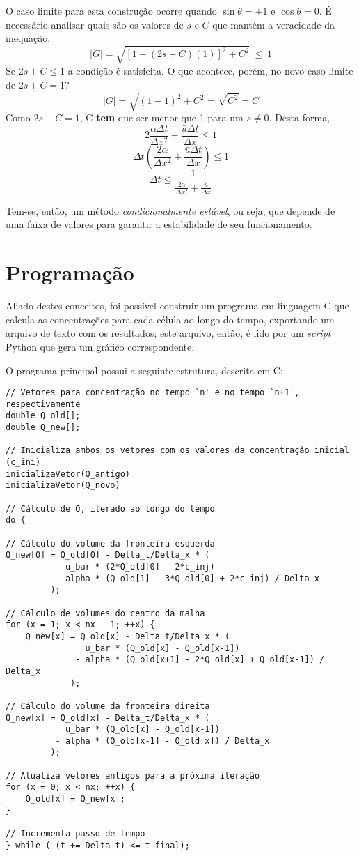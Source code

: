 O caso limite para esta construção ocorre quando $\sin\theta = \pm 1$ e
$\cos\theta = 0$. É necessário analisar quais são os valores de $s$ e $C$ que
mantém a veracidade da inequação.
\[
    |G| = \sqrt{[1 - (2s + C)(1)]^2 + C^2} \ \leq\ 1
\]
Se $2s + C \leq 1$ a condição é satisfeita. O que acontece, porém, no novo caso
limite de $2s + C = 1$?
\[
    |G| = \sqrt{(1-1)^2 + C^2} = \sqrt{C^2} = C
\]
Como $2s + C = 1$, C \textbf{tem} que ser menor que 1 para um $s \neq 0$. Desta
forma,
\[
    2\frac{\alpha\Delta t}{\Delta x^2} + \frac{\bar{u}\Delta t}{\Delta x} \leq 1
\]
\[
    \Delta t
    \left(
        \frac{2\alpha}{\Delta x^2} + \frac{\bar{u}\Delta t}{\Delta x}
    \right) \leq 1
\]
\begin{equation}
    \Delta t
    \leq
    \frac{1}{\frac{2\alpha}{\Delta x^2} + \frac{\bar{u}}{\Delta x}}
\end{equation}

Tem-se, então, um método \emph{condicionalmente estável}, ou seja, que depende
de uma faixa de valores para garantir a estabilidade de seu funcionamento.

\section{Programação}
Aliado destes conceitos, foi possível construir um programa em linguagem C que
calcula as concentrações para cada célula ao longo do tempo, exportando um
arquivo de texto com os resultados; este arquivo, então, é lido por um
\textit{script} Python que gera um gráfico correspondente.

O programa principal possui a seguinte estrutura, descrita em C:

\begin{Verbatim}[fontsize=\footnotesize]
// Vetores para concentração no tempo `n' e no tempo `n+1', respectivamente
double Q_old[];
double Q_new[];

// Inicializa ambos os vetores com os valores da concentração inicial (c_ini)
inicializaVetor(Q_antigo)
inicializaVetor(Q_novo)

// Cálculo de Q, iterado ao longo do tempo
do {

// Cálculo do volume da fronteira esquerda
Q_new[0] = Q_old[0] - Delta_t/Delta_x * (
            u_bar * (2*Q_old[0] - 2*c_inj)
          - alpha * (Q_old[1] - 3*Q_old[0] + 2*c_inj) / Delta_x
         );

// Cálculo de volumes do centro da malha
for (x = 1; x < nx - 1; ++x) {
    Q_new[x] = Q_old[x] - Delta_t/Delta_x * (
                u_bar * (Q_old[x] - Q_old[x-1])
              - alpha * (Q_old[x+1] - 2*Q_old[x] + Q_old[x-1]) / Delta_x
             );

// Cálculo do volume da fronteira direita
Q_new[x] = Q_old[x] - Delta_t/Delta_x * (
            u_bar * (Q_old[x] - Q_old[x-1])
          - alpha * (Q_old[x-1] - Q_old[x]) / Delta_x
         );

// Atualiza vetores antigos para a próxima iteração
for (x = 0; x < nx; ++x) {
    Q_old[x] = Q_new[x];
}

// Incrementa passo de tempo
} while ( (t += Delta_t) <= t_final);

\end{Verbatim}

